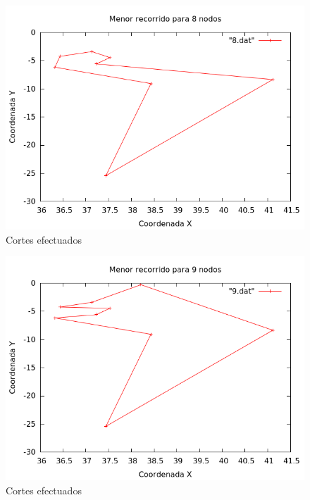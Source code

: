 \begin{figure}[H]
    \centering
    \includegraphics[scale=0.5]{../TSP/Graficas/8.png}
    \caption{Cortes efectuados}
\end{figure}

\begin{figure}[H]
    \centering
    \includegraphics[scale=0.5]{../TSP/Graficas/9.png}
    \caption{Cortes efectuados}
\end{figure}

